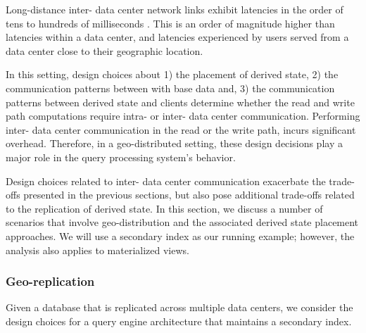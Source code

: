 Long-distance inter- data center network links exhibit latencies in the order of tens to hundreds of milliseconds \cite{pbailis:hats}.
This is an order of magnitude higher than latencies within a data center,
and latencies experienced by users served from a data center close to their geographic location.

In this setting, design choices about 1) the placement of derived state,
2) the communication patterns between with base data and, 3) the communication patterns between derived state and clients
determine whether the read and write path computations require intra- or inter- data center communication.
Performing inter- data center communication in the read or the write path,
incurs significant overhead.
Therefore, in a geo-distributed setting,
these design decisions play a major role in the query processing system's behavior.

Design choices related to inter- data center communication exacerbate the trade-offs presented in the previous sections,
but also pose additional trade-offs related to the replication of derived state.
In this section, we discuss a number of scenarios that involve geo-distribution and the associated derived state placement approaches.
We will use a secondary index as our running example; however, the analysis also applies to materialized views.

\subsubsection{Geo-replication}
Given a database that is replicated across multiple data centers, we consider the design choices for a
query engine architecture that maintains a secondary index.

